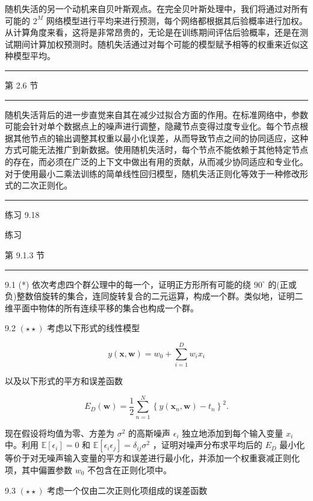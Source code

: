 \documentclass[10pt]{report}
\newcommand{\HRule}{\begin{center}\rule{0.9\linewidth}{0.2mm}\end{center}}
\begin{document}
随机失活的另一个动机来自贝叶斯观点。在完全贝叶斯处理中，我们将通过对所有可能的 \({2}^{M}\) 网络模型进行平均来进行预测，每个网络都根据其后验概率进行加权。从计算角度来看，这将是非常昂贵的，无论是在训练期间评估后验概率，还是在测试期间计算加权预测时。随机失活通过对每个可能的模型赋予相等的权重来近似这种模型平均。

\HRule

第 2.6 节

\HRule

随机失活背后的进一步直觉来自其在减少过拟合方面的作用。在标准网络中，参数可能会针对单个数据点上的噪声进行调整，隐藏节点变得过度专业化。每个节点根据其他节点的输出调整其权重以最小化误差，从而导致节点之间的协同适应，这种方式可能无法推广到新数据。使用随机失活时，每个节点不能依赖于其他特定节点的存在，而必须在广泛的上下文中做出有用的贡献，从而减少协同适应和专业化。对于使用最小二乘法训练的简单线性回归模型，随机失活正则化等效于一种修改形式的二次正则化。

\HRule

练习 9.18

练习

第 9.1.3 节

\HRule

9.1 (*) 依次考虑四个群公理中的每一个，证明正方形所有可能的绕 \({90}^{ \circ  }\) 的(正或负)整数倍旋转的集合，连同旋转复合的二元运算，构成一个群。类似地，证明二维平面中物体的所有连续平移的集合也构成一个群。

9.2 \(\left( {\star  \star  }\right)\) 考虑以下形式的线性模型

\[
y\left( {\mathbf{x},\mathbf{w}}\right)  = {w}_{0} + \mathop{\sum }\limits_{{i = 1}}^{D}{w}_{i}{x}_{i} \tag{9.52}
\]

以及以下形式的平方和误差函数

\[
{E}_{D}\left( \mathbf{w}\right)  = \frac{1}{2}\mathop{\sum }\limits_{{n = 1}}^{N}{\left\{  y\left( {\mathbf{x}}_{n},\mathbf{w}\right)  - {t}_{n}\right\}  }^{2}. \tag{9.53}
\]

现在假设将均值为零、方差为 \({\sigma }^{2}\) 的高斯噪声 \({\epsilon }_{i}\) 独立地添加到每个输入变量 \({x}_{i}\) 中。利用 \(\mathbb{E}\left\lbrack  {\epsilon }_{i}\right\rbrack   = 0\) 和 \(\mathbb{E}\left\lbrack  {{\epsilon }_{i}{\epsilon }_{j}}\right\rbrack   = {\delta }_{ij}{\sigma }^{2}\) ，证明对噪声分布求平均后的 \({E}_{D}\) 最小化等价于对无噪声输入变量的平方和误差进行最小化，并添加一个权重衰减正则化项，其中偏置参数 \({w}_{0}\) 不包含在正则化项中。

9.3 \(\left( {\star  \star  }\right)\) 考虑一个仅由二次正则化项组成的误差函数
\end{document}
